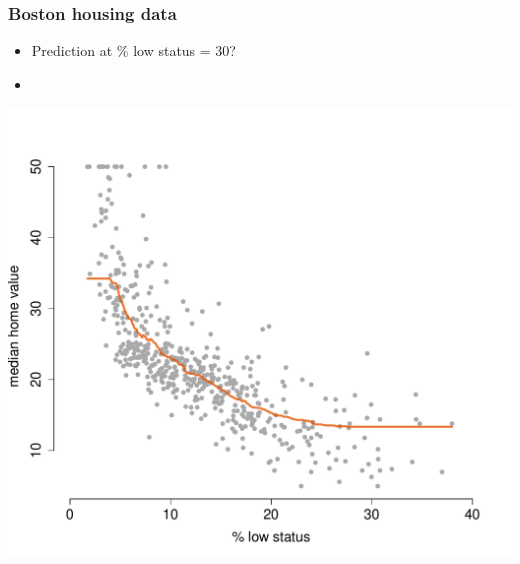 \documentclass{beamer}
\newcommand{\bo}[1]{\textcolor{burntorange}{#1}}
\begin{document}
\begin{frame}[plain]
\frametitle{Boston housing data}
\vspace{5mm}
\begin{itemize}
\item[] Prediction at \bo{\% low status} = 30? \textcolor{white}{fill}
\item[] \textcolor{white}{fill}
\end{itemize}
\vspace{-16mm}
\begin{center}
\includegraphics[scale=.39]{DaveBostonplot3.pdf}
\end{center}

\end{frame}

%
\end{document}
